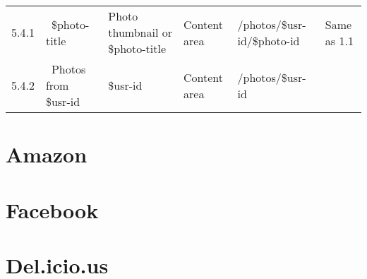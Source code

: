 \documentclass[12pt,a4paper]{article}
\begin{document}
\begin{landscape}
\begin{table}[h!b!p!]
\begin{center}
\begin{tiny}
\begin{tabular}{l|l|l|l|l|p{3cm}}
                5.4.1 &
                ~\$photo-title &
                Photo thumbnail or \$photo-title &
                Content area &
                /photos/\$usr-id/\$photo-id &
                Same as 1.1 \\

                5.4.2 &
                ~Photos from \$usr-id &
                \$usr-id &
                Content area &
                /photos/\$usr-id &
                \\



          \end{tabular}
        \rm
      \end{tiny}
    \end{center}
  \end{table}
\end{landscape}

\section{Amazon}

\section{Facebook}

\section{Del.icio.us}
\end{document}
